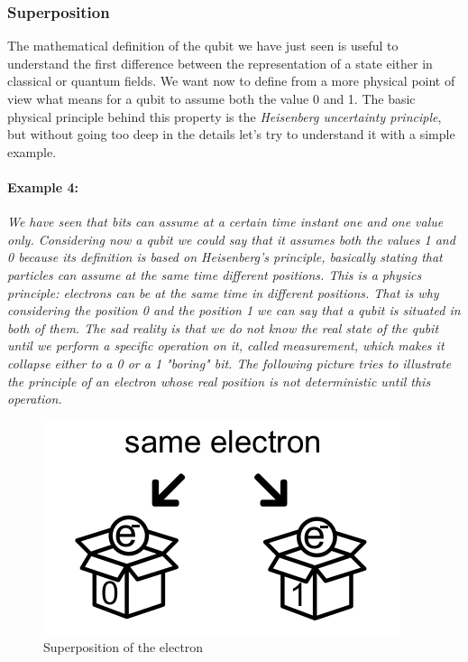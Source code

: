 \documentclass[english]{article}
\begin{document}
			\subsubsection{Superposition}
			\label{sec:superposition}
				The mathematical definition of the qubit we have just seen is useful to understand the first difference between the representation of a state either in classical or quantum fields. We want now to define from a more physical point of view what means for a qubit to assume both the value 0 and 1. The basic physical principle behind this property is the \emph{Heisenberg uncertainty principle}, but without going too deep in the details let's try to understand it with a simple example. 
				
				\paragraph{Example 4:} \emph{We have seen that bits can assume at a certain time instant one and one value only. Considering now a qubit we could say that it assumes both the values 1 and 0 because its definition is based on Heisenberg's principle, basically stating that particles can assume at the same time different positions. This is a physics principle: electrons can be at the same time in different positions. That is why considering the position 0 and the position 1 we can say that a qubit is situated in both of them. The sad reality is that we do not know the real state of the qubit until we perform a specific operation on it, called measurement, which makes it collapse either to a 0 or a 1 "boring" bit. The following picture tries to illustrate the principle of an electron whose real position is not deterministic until this operation.}
				
				\newpage
				
				\begin{figure}[ht]
					\centering
					\includegraphics[scale=0.75]{superposition.png}
					\caption{Superposition of the electron}
				\end{figure}
			
\end{document}
